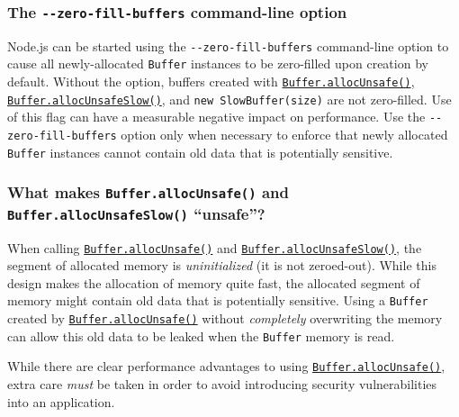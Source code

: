 \subsubsection{\texorpdfstring{The \texttt{-\/-zero-fill-buffers}
command-line
option}{The -\/-zero-fill-buffers command-line option}}\label{the---zero-fill-buffers-command-line-option}

Node.js can be started using the \texttt{-\/-zero-fill-buffers}
command-line option to cause all newly-allocated \texttt{Buffer}
instances to be zero-filled upon creation by default. Without the
option, buffers created with
\hyperref[static-method-bufferallocunsafesize]{\texttt{Buffer.allocUnsafe()}},
\hyperref[static-method-bufferallocunsafeslowsize]{\texttt{Buffer.allocUnsafeSlow()}},
and \texttt{new\ SlowBuffer(size)} are not zero-filled. Use of this flag
can have a measurable negative impact on performance. Use the
\texttt{-\/-zero-fill-buffers} option only when necessary to enforce
that newly allocated \texttt{Buffer} instances cannot contain old data
that is potentially sensitive.

\begin{Shaded}
\begin{Highlighting}[]
\end{Highlighting}
\end{Shaded}

\subsubsection{\texorpdfstring{What makes \texttt{Buffer.allocUnsafe()}
and \texttt{Buffer.allocUnsafeSlow()}
``unsafe''?}{What makes Buffer.allocUnsafe() and Buffer.allocUnsafeSlow() ``unsafe''?}}\label{what-makes-buffer.allocunsafe-and-buffer.allocunsafeslow-unsafe}

When calling
\hyperref[static-method-bufferallocunsafesize]{\texttt{Buffer.allocUnsafe()}}
and
\hyperref[static-method-bufferallocunsafeslowsize]{\texttt{Buffer.allocUnsafeSlow()}},
the segment of allocated memory is \emph{uninitialized} (it is not
zeroed-out). While this design makes the allocation of memory quite
fast, the allocated segment of memory might contain old data that is
potentially sensitive. Using a \texttt{Buffer} created by
\hyperref[static-method-bufferallocunsafesize]{\texttt{Buffer.allocUnsafe()}}
without \emph{completely} overwriting the memory can allow this old data
to be leaked when the \texttt{Buffer} memory is read.

While there are clear performance advantages to using
\hyperref[static-method-bufferallocunsafesize]{\texttt{Buffer.allocUnsafe()}},
extra care \emph{must} be taken in order to avoid introducing security
vulnerabilities into an application.

